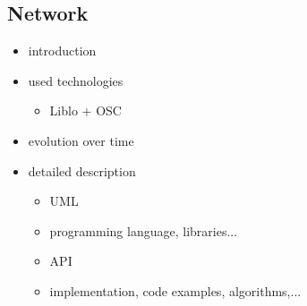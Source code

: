 \documentclass[conference]{acmsiggraph}
\begin{document}

\subsection{Network}
\begin{itemize}
\item introduction
\item{
	used technologies
	\begin{itemize}
	\item Liblo + OSC
	\end{itemize}
}
\item evolution over time
\item{
	detailed description
	\begin{itemize}
	\item UML
	\item programming language, libraries...
	\item API
	\item implementation, code examples, algorithms,...
	\end{itemize}
}
\end{itemize}





\end{document}

